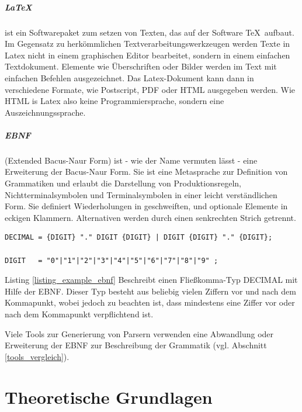 \paragraph*{\LaTeX} ist ein Softwarepaket zum setzen von Texten, das auf der Software \TeX \ aufbaut. Im Gegensatz zu herkömmlichen Textverarbeitungswerkzeugen werden Texte in Latex nicht in einem graphischen Editor bearbeitet, sondern in einem einfachen Textdokument. Elemente wie Überschriften oder Bilder werden im Text mit einfachen Befehlen ausgezeichnet. Das Latex-Dokument kann dann in verschiedene Formate, wie Postscript, PDF oder HTML ausgegeben werden. Wie HTML is Latex also keine Programmiersprache, sondern eine Auszeichnungssprache.


\paragraph*{EBNF}
(Extended Bacus-Naur Form) ist - wie der Name vermuten lässt - eine Erweiterung der Bacus-Naur Form. Sie ist eine Metasprache zur Definition von Grammatiken und erlaubt die Darstellung von Produktionsregeln, Nichtterminalsymbolen und Terminalsymbolen in einer leicht verständlichen Form\cite{NiWi77}. Sie definiert Wiederholungen in geschweiften, und optionale Elemente in eckigen Klammern. Alternativen werden durch einen senkrechten Strich getrennt. 

\begin{lstlisting}[float = htbp,caption={Beschreibung eines Fließkomma-Typs in EBNF.},label=listing_example_ebnf]
DECIMAL = {DIGIT} "." DIGIT {DIGIT} | DIGIT {DIGIT} "." {DIGIT};

DIGIT   = "0"|"1"|"2"|"3"|"4"|"5"|"6"|"7"|"8"|"9" ;
\end{lstlisting}

Listing \ref{listing_example_ebnf} Beschreibt einen Fließkomma-Typ DECIMAL mit Hilfe der EBNF. Dieser Typ besteht aus beliebig vielen Ziffern vor und nach dem Kommapunkt, wobei jedoch zu beachten ist, dass mindestens eine Ziffer vor oder nach dem Kommapunkt verpflichtend ist.

Viele Tools zur Generierung von Parsern verwenden eine Abwandlung oder Erweiterung der EBNF zur Beschreibung der Grammatik (vgl. Abschnitt \ref{tools_vergleich}).




\chapter{Theoretische Grundlagen}


